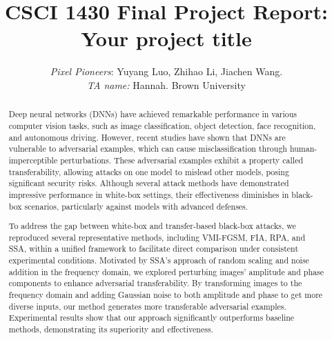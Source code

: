 \title{CSCI 1430 Final Project Report:\\Your project title}

\author{
    \emph{Pixel Pioneers}: Yuyang Luo, Zhihao Li, Jiachen Wang.\\
    \emph{TA name:} Hannah.
    Brown University\\
}

\maketitle

\begin{abstract}
Deep neural networks (DNNs) have achieved remarkable performance in various computer vision tasks, such as image classification, object detection, face recognition, and autonomous driving. However, recent studies have shown that DNNs are vulnerable to adversarial examples, which can cause misclassification through human-imperceptible perturbations. These adversarial examples exhibit a property called transferability, allowing attacks on one model to mislead other models, posing significant security risks. Although several attack methods have demonstrated impressive performance in white-box settings, their effectiveness diminishes in black-box scenarios, particularly against models with advanced defenses.

To address the gap between white-box and transfer-based black-box attacks, we reproduced several representative methods, including VMI-FGSM, FIA, RPA, and SSA, within a unified framework to facilitate direct comparison under consistent experimental conditions. Motivated by SSA's approach of random scaling and noise addition in the frequency domain, we explored perturbing images' amplitude and phase components to enhance adversarial transferability. By transforming images to the frequency domain and adding Gaussian noise to both amplitude and phase to get more diverse inputs, our method generates more transferable adversarial examples. Experimental results show that our approach significantly outperforms baseline methods, demonstrating its superiority and effectiveness.

\end{abstract}


